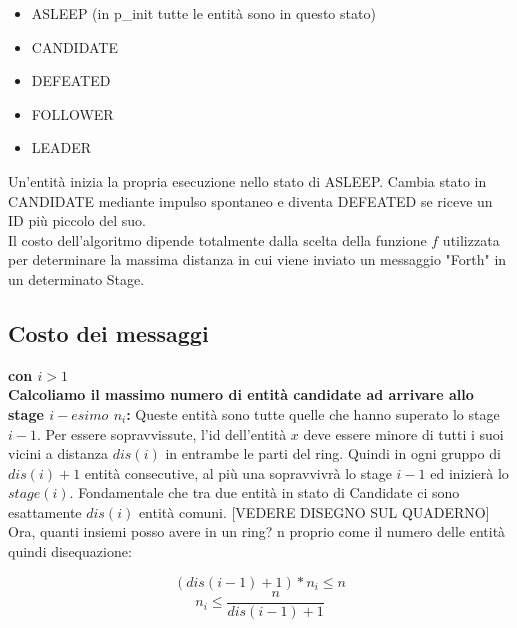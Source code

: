 \begin{itemize}
    \item ASLEEP (in p\_{init} tutte le entità sono in questo stato)
    \item CANDIDATE
    \item DEFEATED
    \item FOLLOWER
    \item LEADER
\end{itemize}

Un'entità inizia la propria esecuzione nello stato di ASLEEP. Cambia stato in
CANDIDATE mediante impulso spontaneo e diventa DEFEATED se riceve un ID più
piccolo del suo.\\
Il costo dell'algoritmo dipende totalmente dalla scelta della funzione $f$
utilizzata per determinare la massima distanza in cui viene inviato un messaggio
"Forth" in un determinato Stage.

\subsection{Costo dei messaggi}
\textbf{con $i>1$}\\
\textbf{Calcoliamo il massimo numero di entità candidate ad arrivare allo stage $i-esimo$ $n_i$:}
Queste entità sono tutte quelle che hanno superato lo stage $i-1$. Per essere
sopravvissute, l'id dell'entità $x$ deve essere minore di tutti i suoi vicini a
distanza $dis(i)$ in entrambe le parti del ring. Quindi in ogni gruppo di
$dis(i) + 1$ entità consecutive, al più una sopravvivrà lo stage $i-1$ ed
inizierà lo $stage(i)$. Fondamentale che tra due entità in stato di Candidate ci
sono esattamente $dis(i)$ entità comuni. [VEDERE DISEGNO SUL QUADERNO] \\
Ora, quanti insiemi posso avere in un ring? n proprio come il numero delle
entità quindi disequazione:

$$(dis(i-1)+1) * n_i \leq n$$
$$n_i \leq \frac{n}{dis(i-1) + 1}$$

